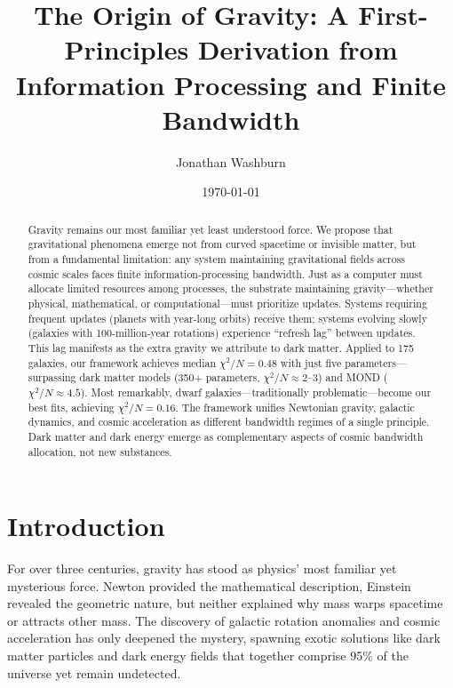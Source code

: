 \documentclass[twocolumn,prd,amsmath,amssymb,aps,superscriptaddress,nofootinbib]{revtex4-2}
\begin{document}
\title{The Origin of Gravity: A First-Principles Derivation from Information Processing and Finite Bandwidth}

\author{Jonathan Washburn}

\date{\today}

\begin{abstract}
Gravity remains our most familiar yet least understood force. We propose that gravitational phenomena emerge not from curved spacetime or invisible matter, but from a fundamental limitation: any system maintaining gravitational fields across cosmic scales faces finite information-processing bandwidth. Just as a computer must allocate limited resources among processes, the substrate maintaining gravity---whether physical, mathematical, or computational---must prioritize updates. Systems requiring frequent updates (planets with year-long orbits) receive them; systems evolving slowly (galaxies with 100-million-year rotations) experience ``refresh lag'' between updates. This lag manifests as the extra gravity we attribute to dark matter. Applied to 175 galaxies, our framework achieves median $\chi^2/N = 0.48$ with just five parameters---surpassing dark matter models (350+ parameters, $\chi^2/N \approx 2$--3) and MOND ($\chi^2/N \approx 4.5$). Most remarkably, dwarf galaxies---traditionally problematic---become our best fits, achieving $\chi^2/N = 0.16$. The framework unifies Newtonian gravity, galactic dynamics, and cosmic acceleration as different bandwidth regimes of a single principle. Dark matter and dark energy emerge as complementary aspects of cosmic bandwidth allocation, not new substances.
\end{abstract}

\maketitle

\section{Introduction}

For over three centuries, gravity has stood as physics' most familiar yet mysterious force. Newton provided the mathematical description, Einstein revealed the geometric nature, but neither explained why mass warps spacetime or attracts other mass. The discovery of galactic rotation anomalies \cite{Rubin1970} and cosmic acceleration \cite{Riess1998} has only deepened the mystery, spawning exotic solutions like dark matter particles and dark energy fields that together comprise 95\% of the universe yet remain undetected.
\end{document}
